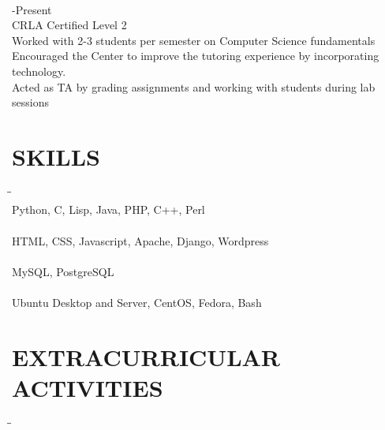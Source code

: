 \documentclass{res}
\begin{document}
\begin{resume}
\begin{tabbing}
\\

   \hspace{-0.25in}{\bf Math/Computer Science Tutor, Chapman University Center for Academic Success} \> -Present\\
	 CRLA Certified Level 2\\
	 Worked with 2-3 students per semester on Computer Science fundamentals\\
	 Encouraged the Center to improve the tutoring experience by incorporating technology.\\
	 Acted as TA by grading assignments and working with students during lab sessions\\
	\end{tabbing}

   \vspace{-0.4in}	
\section{SKILLS}          
	\vspace{-5pt}
   \begin{tabbing}
   \hspace{2.5in}\= \hspace{3.45in}\= \kill %
    \hspace{-0.25in}{\bf Programming Languages} \> \> \\
	Python, C, Lisp, Java, PHP, C++, Perl\\
    \hspace{-0.25in}{\bf Web Development} \> \> \\
	HTML, CSS, Javascript, Apache, Django, Wordpress\\
    \hspace{-0.25in}{\bf Databases} \> \> \\
	MySQL, PostgreSQL\\
    \hspace{-0.25in}{\bf Operating Systems} \> \> \\
	Ubuntu Desktop and Server, CentOS, Fedora, Bash\\

   \vspace{-0.4in}	
\section{EXTRACURRICULAR ACTIVITIES}          
	\vspace{-5pt}
   \begin{tabbing}
   \hspace{2.5in}\= \hspace{3.45in}\= \kill %


\end{tabbing}
\end{tabbing}
\end{resume}
\end{document}
